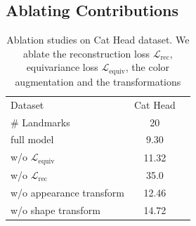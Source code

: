 

	\subsection{Ablating Contributions}\label{sec:ablation}
			\begin{table}
				\centering
				\begin{tabular}{l|cr}
					\hline
					Dataset & Cat Head    \\
					\# Landmarks &  20 \\ \hline
					full model &  9.30 \\ \hline
					w/o $\mathcal{L}_{\textrm{equiv}}$   & 11.32 \\
					w/o $\mathcal{L}_{\textrm{rec}}$   & 35.0 \\
					w/o appearance transform & 12.46 \\
					w/o shape transform & 14.72 \\ \hline
				\end{tabular}
				\caption{{Ablation studies on Cat Head dataset. We ablate the reconstruction loss $\mathcal{L}_{\textrm{rec}}$, equivariance loss $\mathcal{L}_{\textrm{equiv}}$, the color augmentation and the transformations}}
				\label{tab:ablation}
			\end{table}

